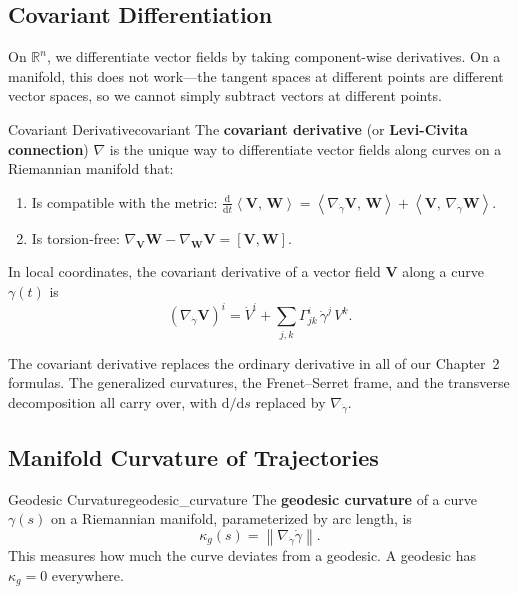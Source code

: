 \documentclass[12pt, openany]{book}
\theoremstyle{plain}
\newcommand{\Reals}{\mathbb{R}}
\newcommand{\dd}{\mathrm{d}}
\newcommand{\norm}[1]{\left\lVert #1 \right\rVert}
\newcommand{\inner}[2]{\left\langle #1,\, #2 \right\rangle}
\begin{document}
\subsection{Covariant Differentiation}

On $\Reals^n$, we differentiate vector fields by taking component-wise
derivatives. On a manifold, this does not work---the tangent spaces at
different points are different vector spaces, so we cannot simply subtract
vectors at different points.

\begin{definition}{Covariant Derivative}{covariant}
  The \textbf{covariant derivative} (or \textbf{Levi-Civita connection})
  $\nabla$ is the unique way to differentiate vector fields along curves on
  a Riemannian manifold that:
  \begin{enumerate}[label=(\roman*)]
    \item Is compatible with the metric:
      $\frac{\dd}{\dd t}\inner{\bm{V}}{\bm{W}} =
      \inner{\nabla_{\dot{\gamma}} \bm{V}}{\bm{W}} +
      \inner{\bm{V}}{\nabla_{\dot{\gamma}} \bm{W}}$.
    \item Is torsion-free: $\nabla_{\bm{V}}\bm{W} - \nabla_{\bm{W}}\bm{V}
      = [\bm{V}, \bm{W}]$.
  \end{enumerate}
  In local coordinates, the covariant derivative of a vector field
  $\bm{V}$ along a curve $\gamma(t)$ is
  \begin{equation}
    (\nabla_{\dot{\gamma}} \bm{V})^i
    = \dot{V}^i + \sum_{j,k} \Gamma^i_{jk}\, \dot{\gamma}^j\, V^k.
  \end{equation}
\end{definition}

The covariant derivative replaces the ordinary derivative in all of our
Chapter~2 formulas. The generalized curvatures, the Frenet--Serret frame,
and the transverse decomposition all carry over, with $\dd/\dd s$ replaced
by $\nabla_{\dot{\gamma}}$.

\subsection{Manifold Curvature of Trajectories}

\begin{definition}{Geodesic Curvature}{geodesic_curvature}
  The \textbf{geodesic curvature} of a curve $\gamma(s)$ on a Riemannian
  manifold, parameterized by arc length, is
  \begin{equation}
    \kappa_g(s) = \norm{\nabla_{\dot{\gamma}} \dot{\gamma}}.
  \end{equation}
  This measures how much the curve deviates from a geodesic. A geodesic
  has $\kappa_g = 0$ everywhere.
\end{definition}
\end{document}
